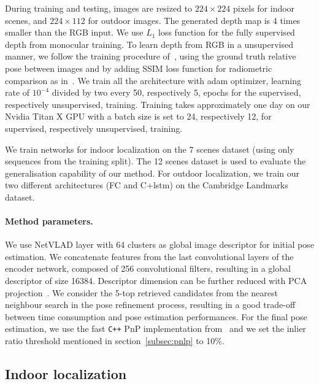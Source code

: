 During training and testing, images are resized to $224 \times 224$ pixels for indoor scenes, and $224 \times 112$ for outdoor images. The generated depth map is 4 times smaller than the RGB input. We use $L_1$ loss function for the fully supervised depth from monocular training. To learn depth from RGB in a unsupervised manner, we follow the training procedure of~\citep{Zhou2017a}, using the ground truth relative pose between images and by adding SSIM loss function for radiometric comparison as in~\citep{Mahjourian2018}. We train all the architecture with adam optimizer, learning rate of $10^{-4}$ divided by two every 50, respectively 5, epochs for the supervised, respectively unsupervised, training. Training takes approximately one day on our Nvidia Titan X GPU with a batch size is set to 24, respectively 12, for supervised, respectively unsupervised, training.

We train networks for indoor localization on the 7 scenes dataset (using only sequences from the training split). The 12 scenes dataset is used to evaluate the generalisation capability of our method. For outdoor localization, we train our two different architectures (FC and C+\ac{lstm}) on the Cambridge Landmarks dataset.

\paragraph{Method parameters.} We use NetVLAD layer with 64 clusters as global image descriptor for initial pose estimation. We concatenate features from the last convolutional layers of the encoder network, composed of 256 convolutional filters, resulting in a global descriptor of size 16384. Descriptor dimension can be further reduced with PCA projection~\citep{Arandjelovic2017}. We consider the 5-top retrieved candidates from the nearest neighbour search in the pose refinement process, resulting in a good trade-off between time consumption and pose estimation performances. For the final pose estimation, we use the fast \texttt{C++} PnP implementation from~\citep{Kneip2014opengv} and we set the inlier ratio threshold mentioned in section~\ref{subsec:pnlp} to 10\%.

\subsection{Indoor localization}
\label{subseq:indoor}

